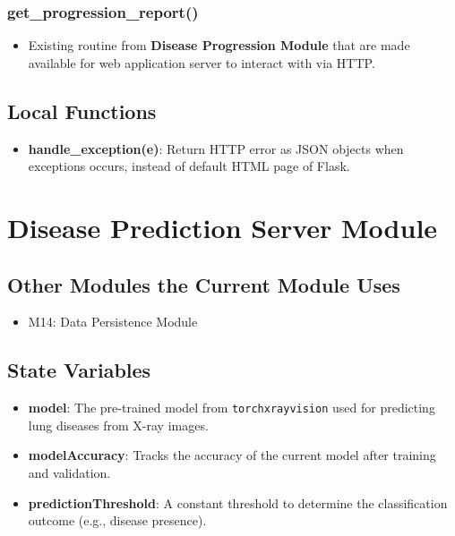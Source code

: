 \documentclass[12pt, titlepage]{article}
\begin{document}
\subsubsection{get\_progression\_report()}
\begin{itemize}
    \item Existing routine from \textbf{Disease Progression Module} that are made available for web application server to interact with via HTTP.
\end{itemize}

\subsection{Local Functions}
\begin{itemize}
    \item \textbf{handle\_exception(e)}: Return HTTP error as JSON objects when exceptions occurs, instead of default HTML page of Flask.
\end{itemize}

\newpage
\section{Disease Prediction Server Module}

\subsection{Other Modules the Current Module Uses}
\begin{itemize}
    \item M14: Data Persistence Module
\end{itemize}

\subsection{State Variables}
\begin{itemize}
    \item \textbf{model}: The pre-trained model from \texttt{torchxrayvision} used for predicting lung diseases from X-ray images.
    \item \textbf{modelAccuracy}: Tracks the accuracy of the current model after training and validation.
    \item \textbf{predictionThreshold}: A constant threshold to determine the classification outcome (e.g., disease presence).
\end{itemize}
\end{document}
